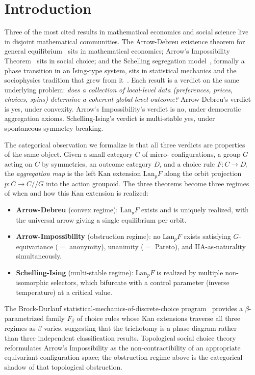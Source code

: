 \documentclass[11pt,a4paper]{article}
\theoremstyle{plain}
\theoremstyle{definition}
\theoremstyle{remark}
\newcommand{\Lan}{\mathrm{Lan}}
\newcommand{\sslash}{\mathbin{/\!\!/}}
\begin{document}
\section{Introduction}
\label{sec:introduction}

Three of the most cited results in mathematical economics and social
science live in disjoint mathematical communities.  The Arrow-Debreu
existence theorem for general equilibrium~\cite{arrow-debreu-1954} sits
in mathematical economics; Arrow's Impossibility
Theorem~\cite{arrow-1951} sits in social choice; and the Schelling
segregation model~\cite{schelling-1971}, formally a phase transition in
an Ising-type system, sits in statistical mechanics and the sociophysics
tradition that grew from it~\cite{galam-2012, bouchaud-2013}.  Each
result is a verdict on the same underlying problem: \emph{does a
collection of local-level data (preferences, prices, choices, spins)
determine a coherent global-level outcome?}  Arrow-Debreu's verdict
is yes, under convexity.  Arrow's Impossibility's verdict is no, under
democratic aggregation axioms.  Schelling-Ising's verdict is multi-stable
yes, under spontaneous symmetry breaking.

The categorical observation we formalize is that all three verdicts are
properties of the same object.  Given a small category $C$ of micro-
configurations, a group $G$ acting on $C$ by symmetries, an outcome
category $D$, and a choice rule $F : C \to D$, the \emph{aggregation
map} is the left Kan extension $\Lan_p F$ along the orbit projection
$p : C \to C \sslash G$ into the action groupoid.  The three theorems
become three regimes of when and how this Kan extension is realized:
\begin{itemize}
  \item \textbf{Arrow-Debreu} (convex regime): $\Lan_p F$ exists and is
        uniquely realized, with the universal arrow giving a single
        equilibrium per orbit.
  \item \textbf{Arrow-Impossibility} (obstruction regime): no $\Lan_p F$
        exists satisfying $G$-equivariance ($=$ anonymity), unanimity
        ($=$ Pareto), and IIA-as-naturality simultaneously.
  \item \textbf{Schelling-Ising} (multi-stable regime): $\Lan_p F$ is
        realized by multiple non-isomorphic selectors, which bifurcate
        with a control parameter (inverse temperature) at a critical
        value.
\end{itemize}

The Brock-Durlauf statistical-mechanics-of-discrete-choice
program~\cite{brock-durlauf-2001} provides a $\beta$-parametrized family
$F_\beta$ of choice rules whose Kan extensions traverse all three
regimes as $\beta$ varies, suggesting that the trichotomy is a phase
diagram rather than three independent classification results.  Topological
social choice theory~\cite{chichilnisky-1980} reformulates Arrow's
Impossibility as the non-contractibility of an appropriate equivariant
configuration space; the obstruction regime above is the categorical
shadow of that topological obstruction.
\end{document}
